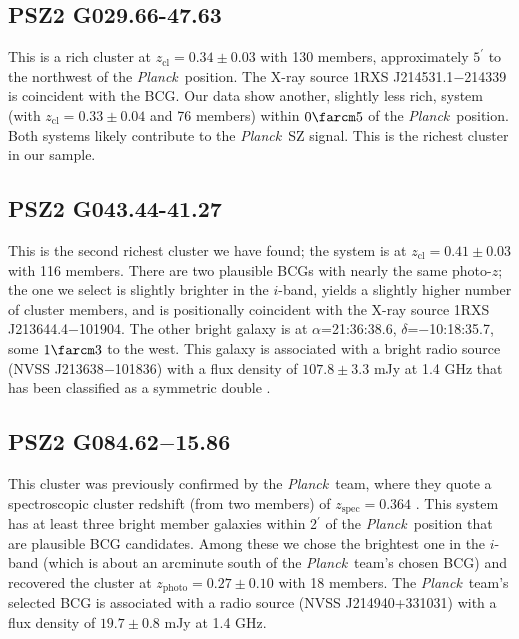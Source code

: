\documentclass[apj, revtex4-1]{emulateapj}
\newcommand{\planck}{\textit{Planck}}
\newcommand{\sdssi}{\hbox{$i$}}
\begin{document}
\subsection{PSZ2 G029.66-47.63} %
This is a rich cluster at $z_\mathrm{cl} = 0.34 \pm 0.03$ with 130 members, approximately $5^\prime$ to the northwest of the \planck\ position. The X-ray source 1RXS J214531.1$-$214339 is coincident with the BCG. Our data show another, slightly less rich, system (with $z_\mathrm{cl} = 0.33 \pm 0.04$ and 76 members) within $0\farcm5$ of the \planck\ position. Both systems likely contribute to the \planck\ SZ signal. This is the richest cluster in our sample.

\subsection{PSZ2 G043.44-41.27} %
This is the second richest cluster we have found; the system is at $z_\mathrm{cl} = 0.41 \pm 0.03$ with 116 members. There are two plausible BCGs with nearly the same photo-$z$; the one we select is slightly brighter in the \sdssi-band, yields a slightly higher number of cluster members, and is positionally coincident with the X-ray source 1RXS J213644.4$-$101904. The other bright galaxy is at $\alpha$=21:36:38.6, $\delta$=$-$10:18:35.7, some $1\farcm3$ to the west. This galaxy is associated with a bright radio source (NVSS J213638$-$101836) with a flux density of $107.8 \pm 3.3$ mJy at 1.4 GHz that has been classified as a symmetric double \citep{Douglas1996}.

\subsection{PSZ2 G084.62$-$15.86} %
This cluster was previously confirmed by the \planck\ team, where they quote a spectroscopic cluster redshift (from two members) of $z_\mathrm{spec} = 0.364$ \citep{PlanckCollaboration2016a}. This system has at least three bright member galaxies within 2$^\prime$ of the \planck\ position that are plausible BCG candidates. Among these we chose the brightest one in the \sdssi-band (which is about an arcminute south of the \planck\ team's chosen BCG) and recovered the cluster at $z_\mathrm{photo} = 0.27 \pm 0.10$ with 18 members. The \planck\ team's selected BCG is associated with a radio source (NVSS J214940+331031) with a flux density of $19.7\pm 0.8$ mJy at 1.4 GHz.
\end{document}
